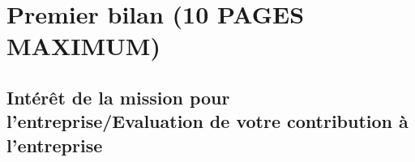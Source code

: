 \documentclass[a4paper, 12pt]{article}
\begin{document}



    
    \newpage{}
    
\newpage{}
\section{Premier bilan (10 PAGES MAXIMUM)}


\subsection{Intérêt de la mission pour l'entreprise/Evaluation de votre contribution à l’entreprise}
\end{document}
